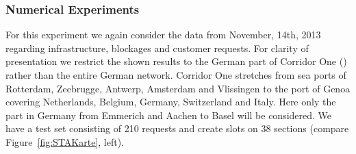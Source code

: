 \subsubsection{Numerical Experiments}
For this experiment we again consider the data from November, 14th, 2013 regarding infrastructure, blockages and customer requests. For clarity of presentation we restrict the shown results to the German part of Corridor One (\cite{Kor1}) rather than the entire German network. Corridor One stretches from sea ports of Rotterdam, Zeebrugge, Antwerp, Amsterdam and Vlissingen to the port of Genoa covering Netherlands, Belgium, Germany, Switzerland and Italy. Here only the part in Germany from Emmerich and Aachen to Basel will be considered. We have a test set consisting of 210 requests and create slots on 38 sections (compare Figure~\ref{fig:STAKarte}, left).
%

